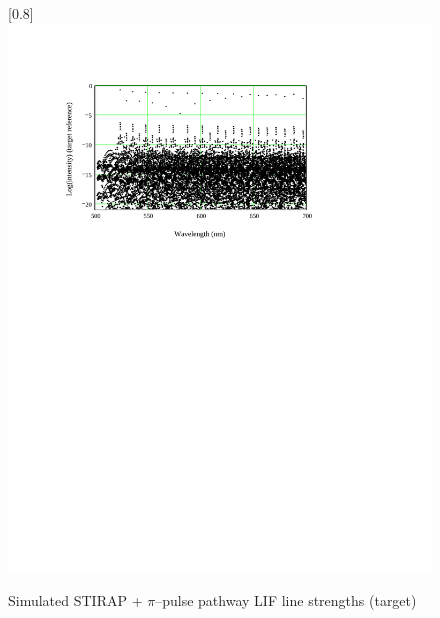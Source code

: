 \begin{figure}
\scalebox{0.8}[0.8]{
\includegraphics[bb=0 480 489 752]
{STIRAP_79/STIRAP_79.pdf}
}
\caption[Simulated STIRAP + $\pi$--pulse pathway LIF line strengths (target)]{Simulated STIRAP + $\pi$--pulse pathway LIF line strengths (target)}
\label{STIRAP_79}
\end{figure}
